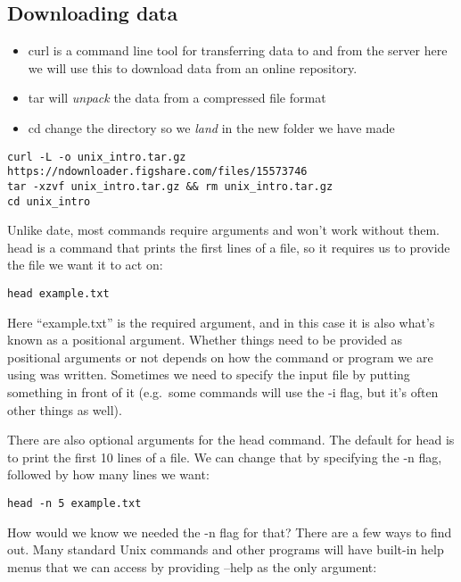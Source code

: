 \documentclass[
]{book}
\begin{document}
\hypertarget{downloading-data}{%
\subsection{Downloading data}\label{downloading-data}}

\begin{itemize}
\item
  curl is a command line tool for transferring data to and from the server here we will use this to download data from an online repository.
\item
  tar will \emph{unpack} the data from a compressed file format
\item
  cd change the directory so we \emph{land} in the new folder we have made
\end{itemize}

\begin{verbatim}
curl -L -o unix_intro.tar.gz https://ndownloader.figshare.com/files/15573746
tar -xzvf unix_intro.tar.gz && rm unix_intro.tar.gz
cd unix_intro
\end{verbatim}

Unlike date, most commands require arguments and won't work without them. head is a command that prints the first lines of a file, so it requires us to provide the file we want it to act on:

\begin{verbatim}
head example.txt
\end{verbatim}

Here ``example.txt'' is the required argument, and in this case it is also what's known as a positional argument. Whether things need to be provided as positional arguments or not depends on how the command or program we are using was written. Sometimes we need to specify the input file by putting something in front of it (e.g.~some commands will use the -i flag, but it's often other things as well).

There are also optional arguments for the head command. The default for head is to print the first 10 lines of a file. We can change that by specifying the -n flag, followed by how many lines we want:

\begin{verbatim}
head -n 5 example.txt
\end{verbatim}

How would we know we needed the -n flag for that? There are a few ways to find out. Many standard Unix commands and other programs will have built-in help menus that we can access by providing --help as the only argument:
\end{document}
